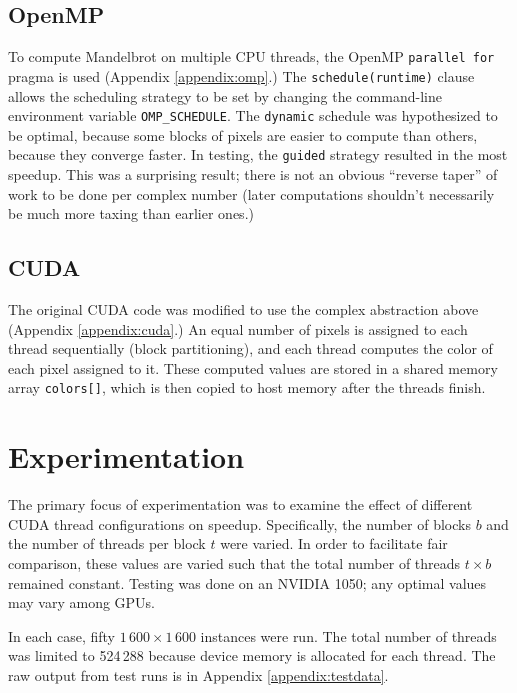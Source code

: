 \documentclass{article}
\begin{document}
    \subsection{OpenMP}
        To compute Mandelbrot on multiple CPU threads, the OpenMP \verb|parallel for| pragma is used (Appendix \ref{appendix:omp}.) The \verb|schedule(runtime)| clause allows the scheduling strategy to be set by changing the command-line environment variable \verb|OMP_SCHEDULE|. The \verb|dynamic| schedule was hypothesized to be optimal, because some blocks of pixels are easier to compute than others, because they converge faster. In testing, the \verb|guided| strategy resulted in the most speedup. This was a surprising result; there is not an obvious ``reverse taper'' of work to be done per complex number (later computations shouldn't necessarily be much more taxing than earlier ones.)

    \subsection{CUDA}
        The original CUDA code was modified to use the complex abstraction above (Appendix \ref{appendix:cuda}.) An equal number of pixels is assigned to each thread sequentially (block partitioning), and each thread computes the color of each pixel assigned to it. These computed values are stored in a shared memory array \verb|colors[]|, which is then copied to host memory after the threads finish.

\section{Experimentation}
    The primary focus of experimentation was to examine the effect of different CUDA thread configurations on speedup. Specifically, the number of blocks $b$ and the number of threads per block $t$ were varied. In order to facilitate fair comparison, these values are varied such that the total number of threads $t \times b$ remained constant. Testing was done on an NVIDIA 1050; any optimal values may vary among GPUs.

    In each case, fifty $1\,600 \times 1\,600$ instances were run. The total number of threads was limited to 524\,288 because device memory is allocated for each thread. The raw output from test runs is in Appendix \ref{appendix:testdata}.

    \def\boxit#1{%
      \smash{\fboxsep=0pt\llap{\rlap{\fbox{\strut\makebox[#1]{}}}~}}\ignorespaces
    }
\end{document}
